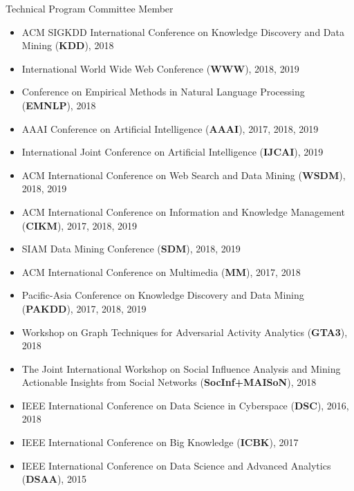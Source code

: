 \documentclass[margin, 9pt]{res}
\begin{document}
\begin{resume}
{Technical Program Committee Member}
\begin{itemize}
\item ACM SIGKDD International Conference on Knowledge Discovery and Data Mining (\textbf{KDD}), 2018
\item International World Wide Web Conference (\textbf{WWW}), 2018, 2019
\item Conference on Empirical Methods in Natural Language Processing (\textbf{EMNLP}), 2018
\item AAAI Conference on Artificial Intelligence (\textbf{AAAI}), 2017, 2018, 2019
\item International Joint Conference on Artificial Intelligence (\textbf{IJCAI}), 2019
\item ACM International Conference on Web Search and Data Mining (\textbf{WSDM}), 2018, 2019
\item ACM International Conference on Information and Knowledge Management (\textbf{CIKM}), 2017, 2018, 2019
\item SIAM Data Mining Conference (\textbf{SDM}), 2018, 2019
\item ACM International Conference on Multimedia (\textbf{MM}), 2017, 2018	
\item Pacific-Asia Conference on Knowledge Discovery and Data Mining (\textbf{PAKDD}), 2017, 2018, 2019
\item Workshop on Graph Techniques for Adversarial Activity Analytics (\textbf{GTA3}), 2018
\item The Joint International Workshop on Social Influence Analysis and Mining Actionable Insights from Social Networks (\textbf{SocInf+MAISoN}), 2018
\item IEEE International Conference on Data Science in Cyberspace (\textbf{DSC}), 2016, 2018
\item IEEE International Conference on Big Knowledge (\textbf{ICBK}), 2017
\item IEEE International Conference on Data Science and Advanced Analytics (\textbf{DSAA}), 2015
\end{itemize}
\vspace{-0.1in}


\end{resume}
\end{document}
